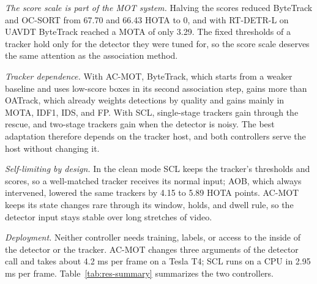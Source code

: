 \emph{The score scale is part of the MOT system.} Halving the scores reduced ByteTrack and OC-SORT from 67.70 and 66.43 HOTA to 0, and with RT-DETR-L on UAVDT ByteTrack reached a MOTA of only 3.29. The fixed thresholds of a tracker hold only for the detector they were tuned for, so the score scale deserves the same attention as the association method.

\emph{Tracker dependence.} With AC-MOT, ByteTrack, which starts from a weaker baseline and uses low-score boxes in its second association step, gains more than OATrack, which already weights detections by quality and gains mainly in MOTA, IDF1, IDS, and FP. With SCL, single-stage trackers gain through the rescue, and two-stage trackers gain when the detector is noisy. The best adaptation therefore depends on the tracker host, and both controllers serve the host without changing it.

\emph{Self-limiting by design.} In the clean mode SCL keeps the tracker's thresholds and scores, so a well-matched tracker receives its normal input; AOB, which always intervened, lowered the same trackers by 4.15 to 5.89 HOTA points. AC-MOT keeps its state changes rare through its window, holds, and dwell rule, so the detector input stays stable over long stretches of video.

\emph{Deployment.} Neither controller needs training, labels, or access to the inside of the detector or the tracker. AC-MOT changes three arguments of the detector call and takes about 4.2 ms per frame on a Tesla T4; SCL runs on a CPU in 2.95 ms per frame. Table~\ref{tab:res-summary} summarizes the two controllers.

